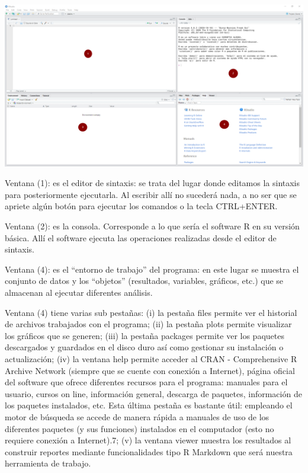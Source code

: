\documentclass[
]{book}
\begin{document}
\includegraphics{data/RS03.png}

Ventana (1): es el editor de sintaxis: se trata del lugar donde editamos la sintaxis para posteriormente ejecutarla. Al escribir allí no sucederá nada, a no ser que se apriete algún botón para ejecutar los comandos o la tecla CTRL+ENTER.

Ventana (2): es la consola. Corresponde a lo que sería el software R en su versión básica. Allí el software ejecuta las operaciones realizadas desde el editor de sintaxis.

Ventana (4): es el ``entorno de trabajo'' del programa: en este lugar se muestra el conjunto de datos y los ``objetos'' (resultados, variables, gráficos, etc.) que se almacenan al ejecutar diferentes análisis.

Ventana (4) tiene varias sub pestañas: (i) la pestaña files permite ver el historial de archivos trabajados con el programa; (ii) la pestaña plots permite visualizar los gráficos que se generen; (iii) la pestaña packages permite ver los paquetes descargados y guardados en el disco duro así como gestionar su instalación o actualización; (iv) la ventana help permite acceder al CRAN - Comprehensive R Archive Network (siempre que se cuente con conexión a Internet), página oficial del software que ofrece diferentes recursos para el programa: manuales para el usuario, cursos on line, información general, descarga de paquetes, información de los paquetes instalados, etc. Esta última pestaña es bastante útil: empleando el motor de búsqueda se accede de manera rápida a manuales de uso de los diferentes paquetes (y sus funciones) instalados en el computador (esto no requiere conexión a Internet).7; (v) la ventana viewer muestra los resultados al construir reportes mediante funcionalidades tipo R Markdown que será nuestra herramienta de trabajo.
\end{document}
